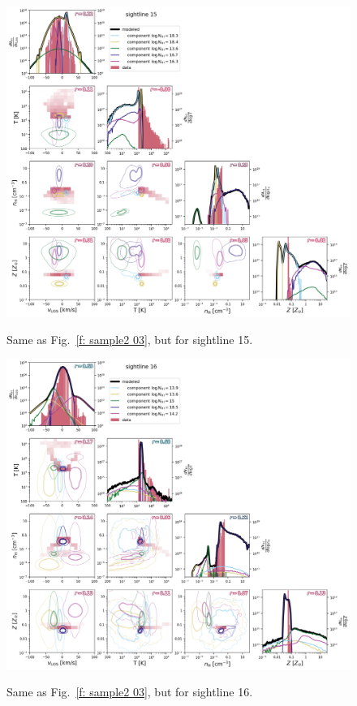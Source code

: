 \documentclass[fleqn,usenatbib]{mnras}
\begin{document}
\begin{figure}
    \centering
    \includegraphics[width=\textwidth]{figures/sample2/sightline_0015.png}
    \label{f: sample2 15}
    \caption{Same as Fig.~\ref{f: sample2 03}, but for sightline 15.}
\end{figure}

\begin{figure}
    \centering
    \includegraphics[width=\textwidth]{figures/sample2/sightline_0016.png}
    \label{f: sample2 16}
    \caption{Same as Fig.~\ref{f: sample2 03}, but for sightline 16.}
\end{figure}
\end{document}
